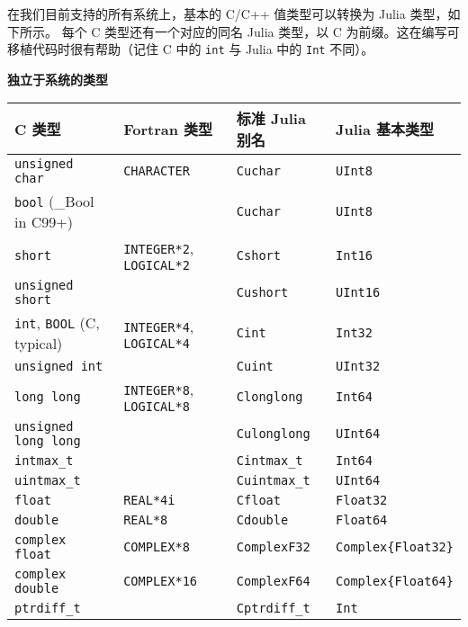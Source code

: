 在我们目前支持的所有系统上，基本的 C/C++ 值类型可以转换为 Julia 类型，如下所示。 每个 C 类型还有一个对应的同名 Julia 类型，以 C 为前缀。这在编写可移植代码时很有帮助（记住 C 中的 \texttt{int} 与 Julia 中的 \texttt{Int} 不同）。



\textbf{独立于系统的类型}




\begin{table}[h]

\begin{tabulary}{\linewidth}{|L|L|L|L|}
\hline
C 类型 & Fortran 类型 & 标准 Julia 别名 & Julia 基本类型 \\
\hline
\texttt{unsigned char} & \texttt{CHARACTER} & \texttt{Cuchar} & \texttt{UInt8} \\
\hline
\texttt{bool} (\_Bool in C99+) &  & \texttt{Cuchar} & \texttt{UInt8} \\
\hline
\texttt{short} & \texttt{INTEGER*2}, \texttt{LOGICAL*2} & \texttt{Cshort} & \texttt{Int16} \\
\hline
\texttt{unsigned short} &  & \texttt{Cushort} & \texttt{UInt16} \\
\hline
\texttt{int}, \texttt{BOOL} (C, typical) & \texttt{INTEGER*4}, \texttt{LOGICAL*4} & \texttt{Cint} & \texttt{Int32} \\
\hline
\texttt{unsigned int} &  & \texttt{Cuint} & \texttt{UInt32} \\
\hline
\texttt{long long} & \texttt{INTEGER*8}, \texttt{LOGICAL*8} & \texttt{Clonglong} & \texttt{Int64} \\
\hline
\texttt{unsigned long long} &  & \texttt{Culonglong} & \texttt{UInt64} \\
\hline
\texttt{intmax\_t} &  & \texttt{Cintmax\_t} & \texttt{Int64} \\
\hline
\texttt{uintmax\_t} &  & \texttt{Cuintmax\_t} & \texttt{UInt64} \\
\hline
\texttt{float} & \texttt{REAL*4i} & \texttt{Cfloat} & \texttt{Float32} \\
\hline
\texttt{double} & \texttt{REAL*8} & \texttt{Cdouble} & \texttt{Float64} \\
\hline
\texttt{complex float} & \texttt{COMPLEX*8} & \texttt{ComplexF32} & \texttt{Complex\{Float32\}} \\
\hline
\texttt{complex double} & \texttt{COMPLEX*16} & \texttt{ComplexF64} & \texttt{Complex\{Float64\}} \\
\hline
\texttt{ptrdiff\_t} &  & \texttt{Cptrdiff\_t} & \texttt{Int} \\

\end{tabulary}
\end{table}
